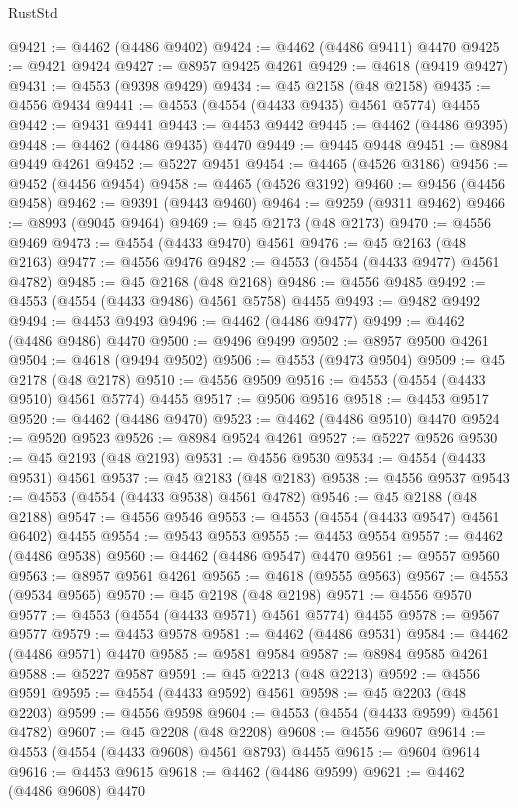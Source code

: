 \begin{lexlean}{RustStd}
\begin{coremodule}
@9421 := @4462 (@4486 @9402)
@9424 := @4462 (@4486 @9411) @4470
@9425 := @9421 @9424
@9427 := @8957 @9425 @4261
@9429 := @4618 (@9419 @9427)
@9431 := @4553 (@9398 @9429)
@9434 := @45 @2158 (@48 @2158)
@9435 := @4556 @9434
@9441 := @4553 (@4554 (@4433 @9435) @4561 @5774) @4455
@9442 := @9431 @9441
@9443 := @4453 @9442
@9445 := @4462 (@4486 @9395)
@9448 := @4462 (@4486 @9435) @4470
@9449 := @9445 @9448
@9451 := @8984 @9449 @4261
@9452 := @5227 @9451
@9454 := @4465 (@4526 @3186)
@9456 := @9452 (@4456 @9454)
@9458 := @4465 (@4526 @3192)
@9460 := @9456 (@4456 @9458)
@9462 := @9391 (@9443 @9460)
@9464 := @9259 (@9311 @9462)
@9466 := @8993 (@9045 @9464)
@9469 := @45 @2173 (@48 @2173)
@9470 := @4556 @9469
@9473 := @4554 (@4433 @9470) @4561
@9476 := @45 @2163 (@48 @2163)
@9477 := @4556 @9476
@9482 := @4553 (@4554 (@4433 @9477) @4561 @4782)
@9485 := @45 @2168 (@48 @2168)
@9486 := @4556 @9485
@9492 := @4553 (@4554 (@4433 @9486) @4561 @5758) @4455
@9493 := @9482 @9492
@9494 := @4453 @9493
@9496 := @4462 (@4486 @9477)
@9499 := @4462 (@4486 @9486) @4470
@9500 := @9496 @9499
@9502 := @8957 @9500 @4261
@9504 := @4618 (@9494 @9502)
@9506 := @4553 (@9473 @9504)
@9509 := @45 @2178 (@48 @2178)
@9510 := @4556 @9509
@9516 := @4553 (@4554 (@4433 @9510) @4561 @5774) @4455
@9517 := @9506 @9516
@9518 := @4453 @9517
@9520 := @4462 (@4486 @9470)
@9523 := @4462 (@4486 @9510) @4470
@9524 := @9520 @9523
@9526 := @8984 @9524 @4261
@9527 := @5227 @9526
@9530 := @45 @2193 (@48 @2193)
@9531 := @4556 @9530
@9534 := @4554 (@4433 @9531) @4561
@9537 := @45 @2183 (@48 @2183)
@9538 := @4556 @9537
@9543 := @4553 (@4554 (@4433 @9538) @4561 @4782)
@9546 := @45 @2188 (@48 @2188)
@9547 := @4556 @9546
@9553 := @4553 (@4554 (@4433 @9547) @4561 @6402) @4455
@9554 := @9543 @9553
@9555 := @4453 @9554
@9557 := @4462 (@4486 @9538)
@9560 := @4462 (@4486 @9547) @4470
@9561 := @9557 @9560
@9563 := @8957 @9561 @4261
@9565 := @4618 (@9555 @9563)
@9567 := @4553 (@9534 @9565)
@9570 := @45 @2198 (@48 @2198)
@9571 := @4556 @9570
@9577 := @4553 (@4554 (@4433 @9571) @4561 @5774) @4455
@9578 := @9567 @9577
@9579 := @4453 @9578
@9581 := @4462 (@4486 @9531)
@9584 := @4462 (@4486 @9571) @4470
@9585 := @9581 @9584
@9587 := @8984 @9585 @4261
@9588 := @5227 @9587
@9591 := @45 @2213 (@48 @2213)
@9592 := @4556 @9591
@9595 := @4554 (@4433 @9592) @4561
@9598 := @45 @2203 (@48 @2203)
@9599 := @4556 @9598
@9604 := @4553 (@4554 (@4433 @9599) @4561 @4782)
@9607 := @45 @2208 (@48 @2208)
@9608 := @4556 @9607
@9614 := @4553 (@4554 (@4433 @9608) @4561 @8793) @4455
@9615 := @9604 @9614
@9616 := @4453 @9615
@9618 := @4462 (@4486 @9599)
@9621 := @4462 (@4486 @9608) @4470

\end{coremodule}
\end{lexlean}
